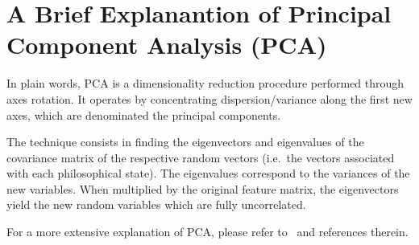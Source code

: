 \documentclass[
 aip,
 jmp,
 amsmath,amssymb,
 reprint,
]{revtex4-1}
\begin{document}
\appendix

\section{A Brief Explanantion of Principal Component Analysis (PCA)}

In plain words, PCA is a dimensionality reduction procedure performed
through axes rotation.  It operates by concentrating
dispersion/variance along the first new axes, which are denominated
the principal components.

The technique consists in finding the eigenvectors and eigenvalues of
the covariance matrix of the respective random vectors (i.e.\ the
vectors associated with each philosophical state). The eigenvalues
correspond to the variances of the new variables.  When multiplied by
the original feature matrix, the eigenvectors yield the new random
variables which are fully uncorrelated.

For a more extensive explanation of PCA, please refer to~\cite{Costa}
and references therein.

\nocite{*}

\end{document}
